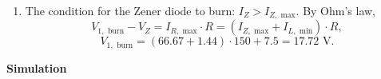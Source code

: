 \documentclass[11pt]{article}
\begin{document}
\begin{enumerate}[leftmargin=*,label=\textbf{\arabic*.}]
For the Zener diode to dissipate maximum power,
\[I_{Z,\text{ max}}=\frac{P_{z,\text{ max}}}{V_Z}=\frac{0.5}{7.5}=66.67\text{ mA}.\]

By KCL,
\[I_{Z,\text{ max}}=I_{R,\text{ max}}-I_{L,\text{ min}}\implies I_{R,\text{ max}}=I_{Z,\text{ max}}+I_{L,\text{ min}},\]
\[I_{R,\text{ max}}=66.67 + 1.44 = 68.11 \text{ mA}\implies R_\text{min}=\frac{V}{I_{R,\text{ max}}}=\frac{8.07}{68.1\times10^{-3}}=118.48\:\Omega.\]

\item The condition for the Zener diode to burn: $I_Z>I_{Z,\text{ max}}$. By Ohm's law,
\[V_{1,\text{ burn}}-V_Z=I_{R,\text{ max}}\cdot R=\left(I_{Z,\text{ max}}+I_{L,\text{ min}}\right)\cdot R,\]
\[V_{1,\text{ burn}}=\left(66.67+1.44\right)\cdot 150+7.5=17.72\text{ V}.\]

\end{enumerate}

\newpage

\textbf{Simulation}
\end{document}

